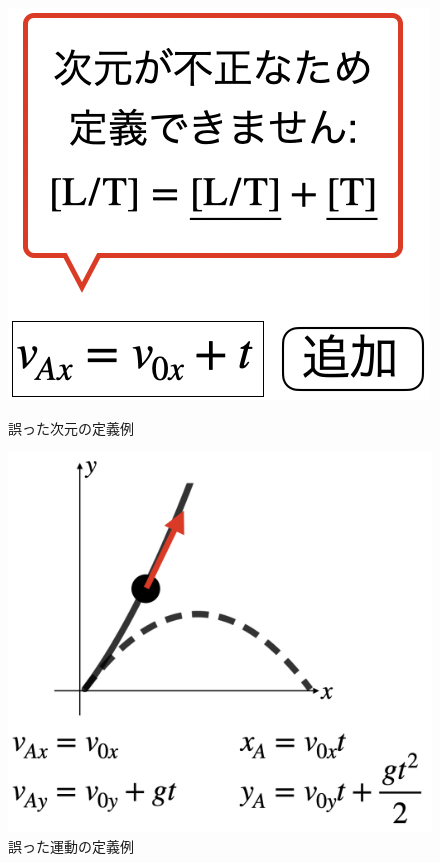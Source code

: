 \documentclass[11pt, a4paper, oneside, twocolumn, dvipdfmx]{jsarticle}
\begin{document}
\begin{figure}[htb]
\centering
\begin{minipage}{0.35\linewidth}
\includegraphics*[width=\linewidth]{work/slide_wrongdim.png}
\caption{誤った次元の定義例} \label{wrongdim}
\end{minipage}
\quad
\begin{minipage}{0.5\linewidth}
\includegraphics*[width=\linewidth]{work/slide_wrongmove.png}
\caption{誤った運動の定義例} \label{wrongmove}
\end{minipage}
\end{figure}
\end{document}
